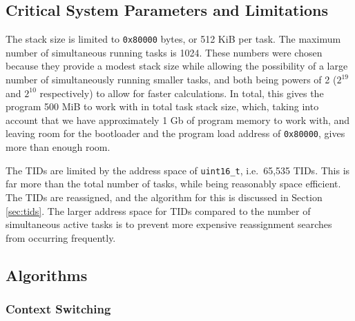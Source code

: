 \documentclass[12pt]{article}
\begin{document}
    \subsection{Critical System Parameters and Limitations}
    \label{sec:limits}
    The stack size is limited to \verb`0x80000` bytes, or 512 KiB per task. The maximum number of simultaneous running tasks is 1024. These numbers were chosen because they provide a modest stack size while allowing the possibility of a large number of simultaneously running smaller tasks, and both being powers of 2 ($2^{19}$ and $2^{10}$ respectively) to allow for faster calculations. In total, this gives the program 500 MiB to work with in total task stack size, which, taking into account that we have approximately 1 Gb of program memory to work with, and leaving room for the bootloader and the program load address of \verb`0x80000`, gives more than enough room.
    
    The TIDs are limited by the address space of \verb`uint16_t`, i.e.\ 65,535 TIDs. This is far more than the total number of tasks, while being reasonably space efficient. The TIDs are reassigned, and the algorithm for this is discussed in Section \ref{sec:tids}. The larger address space for TIDs compared to the number of simultaneous active tasks is to prevent more expensive reassignment searches from occurring frequently.
    
    \subsection{Algorithms}
    
    \subsubsection{Context Switching}
    \label{sec:context-switch}
    
\end{document}
